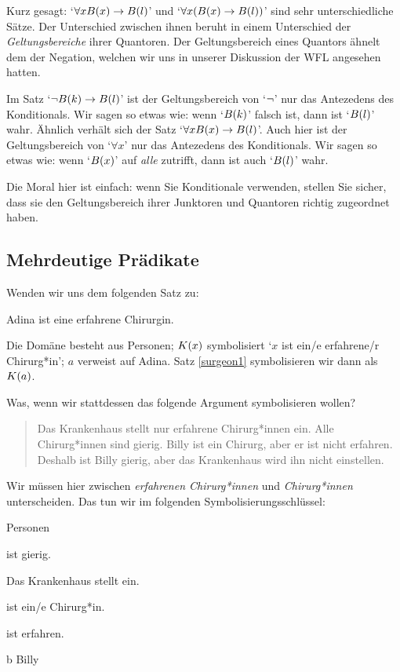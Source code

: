 Kurz gesagt: `$\forall x \mathord{B}(x) \rightarrow \mathord{B}(l)$' und `$\forall x (\mathord{B}(x) \rightarrow \mathord{B}(l))$' sind sehr unterschiedliche Sätze. Der Unterschied zwischen ihnen beruht in einem Unterschied der \emph{Geltungsbereiche} ihrer Quantoren. Der Geltungsbereich eines Quantors ähnelt dem der Negation, welchen wir uns in unserer Diskussion der WFL angesehen hatten.

Im Satz `$\neg \mathord{B}(k) \rightarrow \mathord{B}(l)$' ist der Geltungsbereich von `$\neg$' nur das Antezedens des Konditionals. Wir sagen so etwas wie: wenn `$\mathord{B}(k)$' falsch ist, dann ist `$\mathord{B}(l)$' wahr. Ähnlich verhält sich der Satz `$\forall x \mathord{B}(x) \rightarrow \mathord{B}(l)$'. Auch hier ist der Geltungsbereich von `$\forall x$' nur das Antezedens des Konditionals. Wir sagen so etwas wie: wenn `$\mathord{B}(x)$' auf \emph{alle} zutrifft, dann ist auch `$\mathord{B}(l)$' wahr. 

Die Moral hier ist einfach: wenn Sie Konditionale verwenden, stellen Sie sicher, dass sie den Geltungsbereich ihrer Junktoren und Quantoren richtig zugeordnet haben. 

\subsection{Mehrdeutige Prädikate}

Wenden wir uns dem folgenden Satz zu:
\begin{earg}
\item[\ex{surgeon1}] Adina ist eine erfahrene Chirurgin.
\end{earg}
Die Domäne besteht aus Personen; $\mathord{K}(x)$ symbolisiert `$x$ ist ein/e erfahrene/r Chirurg*in'; $a$ verweist auf Adina. Satz \ref{surgeon1} symbolisieren wir dann als $\mathord{K}(a)$.

Was, wenn wir stattdessen das folgende Argument symbolisieren wollen?
\begin{quote}
Das Krankenhaus stellt nur erfahrene Chirurg*innen ein. Alle Chirurg*innen sind gierig. Billy ist ein Chirurg, aber er ist nicht erfahren. Deshalb ist Billy gierig, aber das Krankenhaus wird ihn nicht einstellen.
\end{quote}
Wir müssen hier zwischen \emph{erfahrenen Chirurg*innen} und \emph{Chirurg*innen} unterscheiden. Das tun wir im folgenden Symbolisierungsschlüssel:
\begin{ekey}
\item[\text{Domäne}] Personen
\item[\atom{G}{x}]  ist gierig.
\item[\atom{K}{x}] Das Krankenhaus stellt  ein. %
\item[\atom{C}{x}]  ist ein/e Chirurg*in. %
\item[\atom{E}{x}]  ist erfahren. %
\item[b] Billy
\end{ekey}

